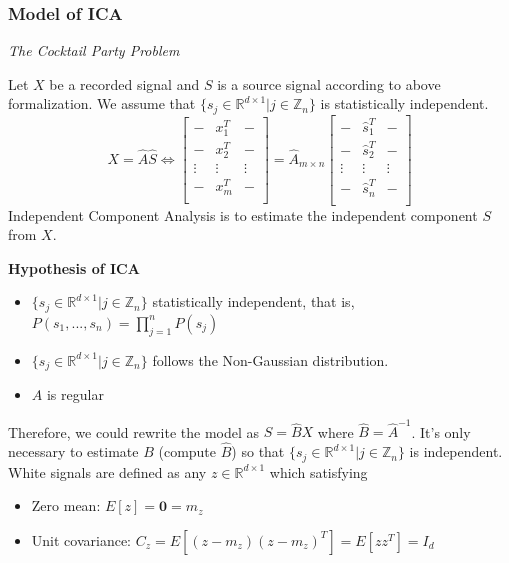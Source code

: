 \documentclass[a4 paper]{article}
\begin{document}
\subsubsection{Model of ICA}
\emph{The Cocktail Party Problem}
    \par Let $X$ be a recorded signal and $S$ is a source signal according to above formalization. We assume that $\{s_j\in\mathbb{R}^{d\times1}|j\in\mathbb{Z}_n\}$ is statistically independent.
\begin{equation}
X=\hat{A}\hat{S}\iff
\begin{bmatrix}
- & x_1^T & -\\
- & x_2^T & -\\
\vdots & \vdots & \vdots\\
- & x_{m}^T & -\\
\end{bmatrix}=
\hat{A}_{m\times n}
\begin{bmatrix}
- & \hat{s}_1^T & -\\
- & \hat{s}_2^T & -\\
\vdots & \vdots & \vdots\\
- & \hat{s}_{n}^T & -\\
\end{bmatrix}
\end{equation}
Independent Component Analysis is to estimate the independent component $S$ from $X$.
\begin{tcolorbox}[colback=RoyalBlue!5!white,colframe=RoyalBlue!75!black]
\textbf{Hypothesis of ICA}
\begin{itemize}
    \item $\{s_j\in\mathbb{R}^{d\times1}|j\in\mathbb{Z}_n\}$ statistically independent, that is, $P(s_1,...,s_n)=\prod_{j=1}^n P(s_j)$
    \item $\{s_j\in\mathbb{R}^{d\times1}|j\in\mathbb{Z}_n\}$ follows the Non-Gaussian distribution.
    \item $A$ is regular
\end{itemize}
Therefore, we could rewrite the model as $\hat{S}=\hat{B}X$ where $\hat{B}=\hat{A}^{-1}$. It's only necessary to estimate $B$ (compute $\hat{B}$) so that $\{s_j\in\mathbb{R}^{d\times1}|j\in\mathbb{Z}_n\}$ is independent.
\tcblower
{}\\
White signals are defined as any $z\in\mathbb{R}^{d\times1}$ which satisfying 
\begin{itemize}
    \item Zero mean: $E[z]=\textbf{0}=m_z$
    \item Unit covariance: $C_z=E[(z-m_{z})(z-m_{z})^T]=E[zz^{T}]=I_d$
\end{itemize}
\end{tcolorbox}
\end{document}
